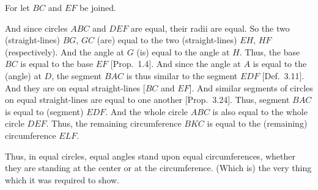 \begin{Parallel}{}{}
{For let $BC$ and $EF$ be joined.

And since circles $ABC$ and $DEF$ are equal, their radii are equal.
So the two (straight-lines) $BG$, $GC$ (are) equal to the two (straight-lines)
$EH$, $HF$ (respectively). And the angle at $G$ (is) equal to the angle at $H$.
Thus, the base $BC$ is equal to the base $EF$ [Prop.~1.4].
And since the angle at $A$ is equal to the (angle) at $D$, the segment $BAC$ is
thus similar to the segment $EDF$ [Def.~3.11]. And they are on
equal straight-lines [$BC$ and $EF$]. And similar segments of circles on equal
straight-lines are equal to one another [Prop.~3.24]. Thus, segment
$BAC$ is equal to (segment) $EDF$. And the whole circle $ABC$ is also
equal to the whole circle $DEF$. Thus, the remaining circumference $BKC$
is equal to the (remaining) circumference $ELF$.

\epsfysize=1.5in
\centerline{}

Thus,   in equal circles, equal angles stand upon equal circumferences, whether they
are standing  at the center or at the circumference. (Which is)
the very thing which it was required to show.}
\end{Parallel}

